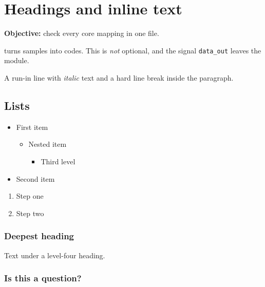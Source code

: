 
\section{Headings and inline text}
\label{sec:headings_and_inline_text}

\textbf{Objective:} check every core mapping in one file.

 turns samples into codes. This is \emph{not} optional, and the signal \verb|data_out| leaves the module.

A run-in line with \emph{italic} text and a hard line break inside the paragraph.

\subsection{Lists}
\label{sec:lists}

\begin{itemize}
    \item First item
    
    \begin{itemize}
        \item Nested item
        
        \begin{itemize}
            \item Third level
        \end{itemize}
    \end{itemize}
    \item Second item
\end{itemize}

\begin{enumerate}
    \item Step one
    \item Step two
\end{enumerate}

\subsubsection{Deepest heading}
\label{sec:deepest_heading}

Text under a level-four heading.

\subsubsection{Is this a question?}
\label{sec:is_this_a_question}


